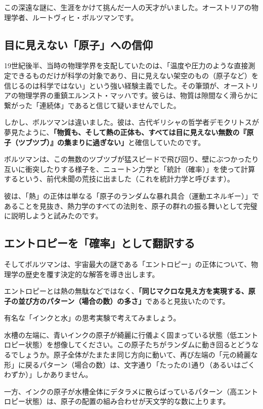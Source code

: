 この深遠な謎に、生涯をかけて挑んだ一人の天才がいました。オーストリアの物理学者、ルートヴィヒ・ボルツマンです。

\subsection{目に見えない「原子」への信仰}

19世紀後半、当時の物理学界を支配していたのは、「温度や圧力のような直接測定できるものだけが科学の対象であり、目に見えない架空のもの（原子など）を信じるのは科学ではない」という強い経験主義でした。その筆頭が、オーストリアの物理学界の重鎮エルンスト・マッハです。彼らは、物質は隙間なく滑らかに繋がった「連続体」であると信じて疑いませんでした。

しかし、ボルツマンは違いました。彼は、古代ギリシャの哲学者デモクリトスが夢見たように、\textbf{「物質も、そして熱の正体も、すべては目に見えない無数の『原子（ツブツブ）』の集まりに過ぎない」}と確信していたのです。

ボルツマンは、この無数のツブツブが猛スピードで飛び回り、壁にぶつかったり互いに衝突したりする様子を、ニュートン力学と「統計（確率）」を使って計算するという、前代未聞の荒技に出ました（これを統計力学と呼びます）。

彼は、「熱」の正体は単なる「原子のランダムな暴れ具合（運動エネルギー）」であることを見抜き、熱力学のすべての法則を、原子の群れの振る舞いとして完璧に説明しようと試みたのです。

\subsection{エントロピーを「確率」として翻訳する}

そしてボルツマンは、宇宙最大の謎である「エントロピー」の正体について、物理学の歴史を覆す決定的な解答を導き出します。

エントロピーとは熱の無駄などではなく、\textbf{「同じマクロな見え方を実現する、原子の並び方のパターン（場合の数）の多さ」}であると見抜いたのです。

有名な「インクと水」の思考実験で考えてみましょう。

水槽の左端に、青いインクの原子が綺麗に行儀よく固まっている状態（低エントロピー状態）を想像してください。この原子たちがランダムに動き回るとどうなるでしょうか。原子全体がたまたま同じ方向に動いて、再び左端の「元の綺麗な形」に戻るパターン（場合の数）は、文字通り「たったの1通り（あるいはごくわずか）」しかありません。

一方、インクの原子が水槽全体にデタラメに散らばっているパターン（高エントロピー状態）は、原子の配置の組み合わせが天文学的な数に上ります。

